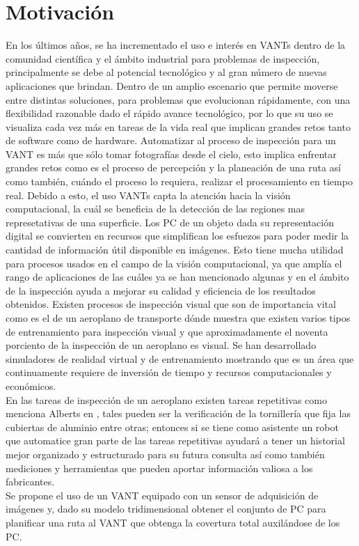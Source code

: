 \documentclass[]{report}
\begin{document}
\section{Motivación}
En los últimos años, se ha incrementado el uso e interés en VANTs dentro de la comunidad científica y el ámbito industrial para problemas de inspección, principalmente se debe al potencial tecnológico y al gran número de nuevas aplicaciones que brindan.  Dentro de un amplio escenario que permite moverse entre distintas soluciones, para problemas que evolucionan rápidamente, con una flexibilidad razonable dado el rápido avance tecnológico, por lo que su uso se visualiza cada vez más en tareas de la vida real que implican grandes retos tanto de software como de hardware.
Automatizar al proceso de inspección para un VANT es más que sólo tomar fotografías desde el cielo, esto implica enfrentar grandes retos como es el proceso de percepción y la planeación de una ruta así como también, cuándo el proceso lo requiera, realizar el procesamiento en tiempo real.
Debido a esto, el uso VANTs capta la atención hacia la visión computacional, la cuál se beneficia de la detección de las regiones mas represetativas de una superficie.
Los PC de un objeto dada su representación digital se convierten en recursos que simplifican los esfuezos para poder medir la cantidad de información útil disponible en imágenes. Esto tiene mucha utilidad para procesos usados en el campo de la visión computacional, ya que amplía el rango de aplicaciones de las cuáles ya se han mencionado algunas y en el ámbito de la inspección ayuda a mejorar su calidad y eficiencia de los resultados obtenidos.
Existen procesos de inspección visual que son de importancia vital como es el de un aeroplano de transporte \cite{sadasivan2005use} dónde muestra que existen varios tipos de entrenamiento para inspección visual y que aproximadamente el noventa porciento de la inspección de un aeroplano es visual. Se han desarrollado simuladores de realidad virtual \cite{sadasivan2005use} y de entrenamiento \cite{gramopadhye2001use} mostrando que es un área que continuamente requiere de inversión de tiempo y recursos computacionales y económicos.\\
En las tareas de inspección de un aeroplano existen tareas repetitivas como menciona Alberts en \cite{alberts1998automated}, tales pueden ser la verificación de la tornillería que fija las cubiertas de aluminio entre otras; entonces si se tiene como asistente un robot que automatice gran parte de las tareas repetitivas ayudará a tener un historial mejor organizado y estructurado para su futura consulta así como también mediciones y herramientas que pueden aportar información valiosa a los fabricantes.\\
Se propone el uso de un VANT equipado con un sensor de adquisición de imágenes y, dado su modelo tridimensional obtener el conjunto de PC para planificar una ruta al VANT que obtenga la covertura total auxilándose de los PC.
\end{document}
